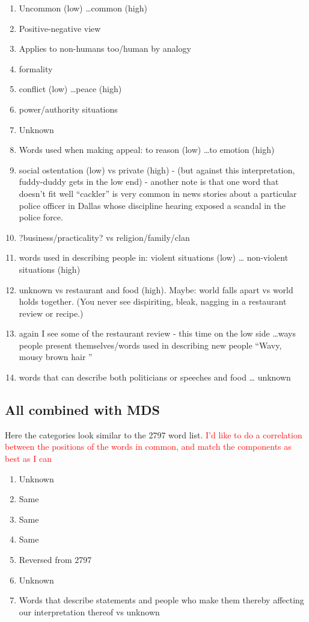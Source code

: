 \documentclass[10pt,letterpaper]{book}
\newcommand{\todo}[1]{\textcolor{red}{#1}}
\begin{document}
\begin{enumerate}
 \item Uncommon (low) \ldots common (high)
 \item Positive-negative view
 \item Applies to non-humans too/human by analogy
 \item formality
 \item conflict (low) \ldots peace (high)
 \item power/authority situations
 \item Unknown
 \item Words used when making appeal: to reason (low) \ldots to emotion (high)
 \item social ostentation (low) vs private (high) - (but against this 
       interpretation, fuddy-duddy gets in the low end) - another note is that 
       one word that doesn't fit well ``cackler'' is very common in news 
       stories about a particular police officer in Dallas whose discipline 
       hearing exposed a scandal in the police force.
 \item ?business/practicality? vs religion/family/clan
 \item words used in describing people in: violent situations (low) \ldots 
       non-violent situations (high)
 \item unknown vs restaurant and food (high). Maybe: world falls apart vs world 
       holds together. (You never see dispiriting, bleak, nagging in a 
       restaurant review or recipe.)
 \item again I see some of the restaurant review - this time on the low side 
       \ldots ways people present themselves/words used in describing new 
       people ``Wavy, mousy brown hair ''
 \item words that can describe both politicians or speeches and food \ldots 
       unknown
\end{enumerate}

\subsection{All combined with MDS}

Here the categories look similar to the 2797 word list. \todo{I'd like to do a 
correlation between the positions of the words in common, and match the 
components as best as I can}

\begin{enumerate}
 \item Unknown
 \item Same
 \item Same
 \item Same
 \item Reversed from 2797
 \item Unknown
 \item Words that describe statements and people who make them thereby 
       affecting our interpretation thereof vs unknown
\end{enumerate}
\end{document}
